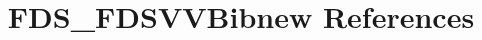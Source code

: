 \documentclass[12pt]{article}
\begin{document}
\nocite{*}
\title{FDS\_FDSVVBibnew References}
\maketitle

%



\end{document}

